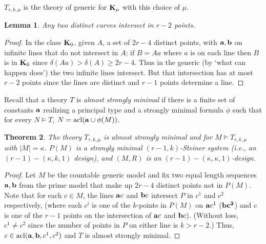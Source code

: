 \documentclass[11pt]{amsart}
\def\bK{{\bf K}}
\def\abar{{\bf a}}
\def\bbar{\bf b}
\newcommand{\sidebar}[1]{\vskip10pt\noindent
 \hskip.70truein\vrule width2.0pt\hskip.5em
 \vbox{\hsize= 4truein\noindent\footnotesize\relax #1 }\vskip10pt\noindent}
\DeclareMathOperator{\acl}{acl}
\newtheorem{theorem}{Theorem}[section]
\newtheorem{lemma}[theorem]{Lemma}
\theoremstyle{definition}
\theoremstyle{remark}
\numberwithin{equation}{section}
\begin{document}











$T_{r,k,\mu}$ is the theory of generic for  $\bK_\mu$ with this choice of
$\mu$.



\begin{lemma}\label{curvesintersect} Any two distinct curves intersect in  $r-2$ points.
\end{lemma}
\begin{proof} In the class $\bK_0$, given $A$, a set of $2r-4$ distinct points, with $\abar, \bbar$ on infinite lines
that do not intersect in  $A$; if $B =Aa$ where $a$ is on each line then $B$ is in  $\bK_0$ since $\delta(Aa) > \delta(A) \geq 2r-4$. Thus in the
generic (by `what can happen does') the two infinite lines intersect. But that
intersection has at most $r-2$ points since the lines are distinct and $r-1$
points determine a line.\end{proof}

Recall that a theory $T$ is {\em almost strongly minimal} \cite{Baldwinasmii}
if there is a finite set of constants $\abar$ realizing a principal type and
a strongly minimal formula $\phi$ such that for every $N\models T$, $N
=\acl(\abar \cup \phi(M))$.


\begin{theorem}\label{asm} The theory $T_{r,k,\mu}$ is almost strongly minimal and for $M \models
T_{r,k,\mu}$ with $|M|=\kappa$. $P(M)$ is a strongly minimal $(r-1,k)$-Steiner
system (i.e., an $(r-1)-(\kappa, k,1)$ design), and $(M,R)$ is an
$(r-1)-(\kappa,\kappa,1)$-design.
\end{theorem}

\begin{proof} Let $M$ be the countable generic model and  fix two equal length
sequences $\abar, \bbar$ from the prime model that make up $2r-4$ distinct points not in $P(M)$.   Note that for each $c \in M$, the lines $\abar c$
and ${\bbar} c$ intersect $P$ in $c^1$ and $c^2$ respectively,
(where each $c^i$ is one of the
$k$-points in $P(M)$ on $\abar c^1$ ($\bbar c^2$)  and $c$ is one of the $r-1$ points on
the intersection of $\abar c $ and ${\bbar} c $). (Without loss, $c^1 \neq
c^2$ since the number of points in $P$ on either line is $k>r-2$.)  Thus,
$c\in \acl(\abar,{\bbar},c^1,c^2)$ and $T$ is almost strongly minimal.

\end{proof}
\end{document}
